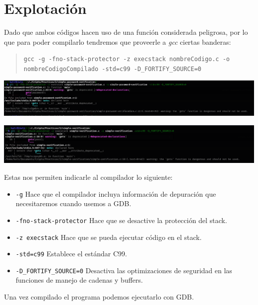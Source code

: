 \section{Explotación}

Dado que ambos códigos hacen uso de una función considerada peligrosa, por lo que para poder compilarlo tendremos que proveerle a \textit{gcc} ciertas banderas:

\begin{quote}
\texttt{gcc -g -fno-stack-protector -z execstack nombreCodigo.c -o nombreCodigoCompilado -std=c99 -D\_FORTIFY\_SOURCE=0}
\end{quote}

\begin{center}
    \includegraphics[scale=.3]{img/compilePassword.png}
\end{center}

\begin{center}
    \includegraphics[scale=.3]{img/compileVerification.png}
\end{center}

Estas nos permiten indicarle al compilador lo siguiente:

\begin{itemize}
  \item \texttt{-g} Hace que el compilador incluya información de depuración que necesitaremos cuando usemos a GDB.
  \item \texttt{-fno-stack-protector} Hace que se desactive la protección del stack.
  \item \texttt{-z execstack} Hace que se pueda ejecutar código en el stack.
  \item \texttt{-std=c99} Establece el estándar C99.
  \item \texttt{-D\_FORTIFY\_SOURCE=0} Desactiva las optimizaciones de seguridad en las funciones de manejo de cadenas y buffers.
\end{itemize}

Una vez compilado el programa podemos ejecutarlo con GDB.

